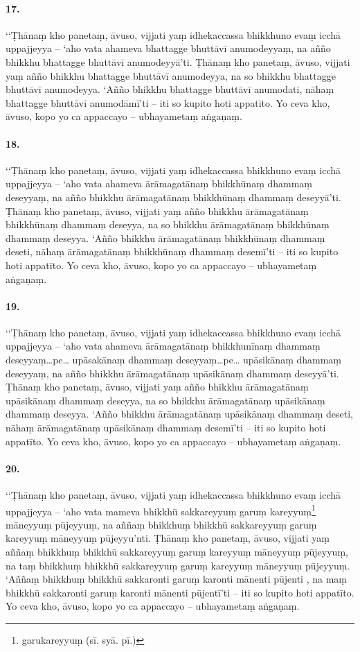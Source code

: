 \paragraph{17.} ‘‘Ṭhānaṃ kho panetaṃ, āvuso, vijjati yaṃ idhekaccassa bhikkhuno evaṃ icchā uppajjeyya – ‘aho vata ahameva bhattagge bhuttāvī anumodeyyaṃ, na añño bhikkhu bhattagge bhuttāvī anumodeyyā’ti. Ṭhānaṃ kho panetaṃ, āvuso, vijjati yaṃ añño bhikkhu bhattagge bhuttāvī anumodeyya, na so bhikkhu bhattagge bhuttāvī anumodeyya. ‘Añño bhikkhu bhattagge bhuttāvī anumodati, nāhaṃ bhattagge bhuttāvī anumodāmī’ti – iti so kupito hoti appatīto. Yo ceva kho, āvuso, kopo yo ca appaccayo – ubhayametaṃ aṅgaṇaṃ.

\paragraph{18.} ‘‘Ṭhānaṃ kho panetaṃ, āvuso, vijjati yaṃ idhekaccassa bhikkhuno evaṃ icchā uppajjeyya – ‘aho vata ahameva ārāmagatānaṃ bhikkhūnaṃ dhammaṃ deseyyaṃ, na añño bhikkhu ārāmagatānaṃ bhikkhūnaṃ dhammaṃ deseyyā’ti. Ṭhānaṃ kho panetaṃ, āvuso, vijjati yaṃ añño bhikkhu ārāmagatānaṃ bhikkhūnaṃ dhammaṃ deseyya, na so bhikkhu ārāmagatānaṃ bhikkhūnaṃ dhammaṃ deseyya. ‘Añño bhikkhu ārāmagatānaṃ bhikkhūnaṃ dhammaṃ deseti, nāhaṃ ārāmagatānaṃ bhikkhūnaṃ dhammaṃ desemī’ti – iti so kupito hoti appatīto. Yo ceva kho, āvuso, kopo yo ca appaccayo – ubhayametaṃ aṅgaṇaṃ.

\paragraph{19.} ‘‘Ṭhānaṃ kho panetaṃ, āvuso, vijjati yaṃ idhekaccassa bhikkhuno evaṃ icchā uppajjeyya – ‘aho vata ahameva ārāmagatānaṃ bhikkhunīnaṃ dhammaṃ deseyyaṃ…pe… upāsakānaṃ dhammaṃ deseyyaṃ…pe… upāsikānaṃ dhammaṃ deseyyaṃ, na añño bhikkhu ārāmagatānaṃ upāsikānaṃ dhammaṃ deseyyā’ti. Ṭhānaṃ kho panetaṃ, āvuso, vijjati yaṃ añño bhikkhu ārāmagatānaṃ upāsikānaṃ dhammaṃ deseyya, na so bhikkhu ārāmagatānaṃ upāsikānaṃ dhammaṃ deseyya. ‘Añño bhikkhu ārāmagatānaṃ upāsikānaṃ dhammaṃ deseti, nāhaṃ ārāmagatānaṃ upāsikānaṃ dhammaṃ desemī’ti – iti so kupito hoti appatīto. Yo ceva kho, āvuso, kopo yo ca appaccayo – ubhayametaṃ aṅgaṇaṃ.

\paragraph{20.} ‘‘Ṭhānaṃ kho panetaṃ, āvuso, vijjati yaṃ idhekaccassa bhikkhuno evaṃ icchā uppajjeyya – ‘aho vata mameva bhikkhū sakkareyyuṃ garuṃ kareyyuṃ\footnote{garukareyyuṃ (sī. syā. pī.)} māneyyuṃ pūjeyyuṃ, na aññaṃ bhikkhuṃ bhikkhū sakkareyyuṃ garuṃ kareyyuṃ māneyyuṃ pūjeyyu’nti. Ṭhānaṃ kho panetaṃ, āvuso, vijjati yaṃ aññaṃ bhikkhuṃ bhikkhū sakkareyyuṃ garuṃ kareyyuṃ māneyyuṃ pūjeyyuṃ, na taṃ bhikkhuṃ bhikkhū sakkareyyuṃ garuṃ kareyyuṃ māneyyuṃ pūjeyyuṃ. ‘Aññaṃ bhikkhuṃ bhikkhū sakkaronti garuṃ karonti mānenti pūjenti , na maṃ bhikkhū sakkaronti garuṃ karonti mānenti pūjentī’ti – iti so kupito hoti appatīto. Yo ceva kho, āvuso, kopo yo ca appaccayo – ubhayametaṃ aṅgaṇaṃ.

